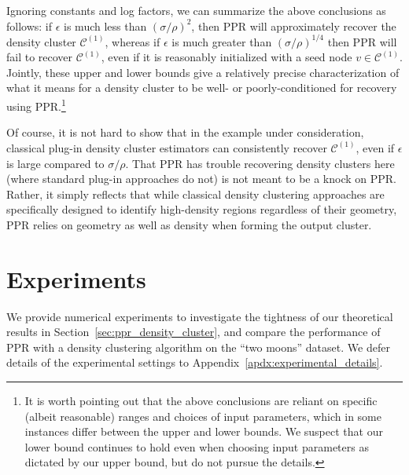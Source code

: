 \documentclass[11pt,twoside]{article}
\newcommand{\1}{\mathbf{1}}
\newcommand{\mc}[1]{\mathcal{#1}}
\begin{document}
Ignoring constants and log factors, we can summarize the above conclusions as follows: if $\epsilon$ is much less than $(\sigma/\rho)^2$, then PPR will approximately recover the density cluster $\mc{C}^{(1)}$, whereas if $\epsilon$ is much greater than $(\sigma/\rho)^{1/4}$ then PPR will fail to recover $\mc{C}^{(1)}$, even if it is reasonably initialized with a seed node $v \in \mc{C}^{(1)}$. Jointly, these upper and lower bounds give a relatively precise characterization of what it means for a density cluster to be well- or poorly-conditioned for recovery using PPR.\footnote{It is worth pointing out that the above conclusions are reliant on specific (albeit reasonable) ranges and choices of input parameters, which in some instances differ between the upper and lower bounds. We suspect that our lower bound continues to hold even when choosing input parameters as dictated by our upper bound, but do not pursue the details.}

Of course, it is not hard to show that in the example under consideration, classical plug-in density cluster estimators can consistently recover $\mc{C}^{(1)}$, even if $\epsilon$ is large compared to $\sigma/\rho$. That PPR has trouble recovering density clusters here (where standard plug-in approaches do not) is not meant to be a knock on PPR. Rather, it simply reflects that while classical density clustering approaches are specifically designed to identify high-density regions regardless of their geometry, PPR relies on geometry as well as density when forming the output cluster. 

\section{Experiments}
\label{sec:experiments}
We provide numerical experiments to investigate the tightness of our theoretical results in Section~\ref{sec:ppr_density_cluster}, and compare the performance of PPR with a density clustering algorithm on the ``two moons'' dataset. We defer details of the experimental settings to Appendix~\ref{apdx:experimental_details}.   
\end{document}
